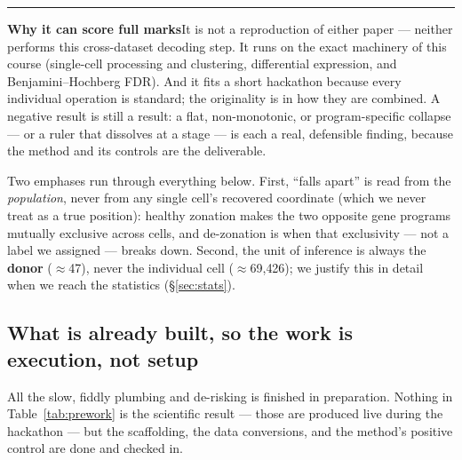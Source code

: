 \documentclass[11pt]{article}
\newcommand{\aside}[2]{\par\medskip\noindent\textcolor{teal0}{\rule{2pt}{\baselineskip}}\quad\textbf{\textcolor{teal0}{#1}}\quad #2\par\medskip}
\begin{document}
\aside{Why it can score full marks}{It is not a reproduction of either paper --- neither performs this
cross-dataset decoding step. It runs on the exact machinery of this course (single-cell processing and
clustering, differential expression, and Benjamini--Hochberg FDR). And it fits a short hackathon
because every individual operation is standard; the originality is in how they are combined. A negative
result is still a result: a flat, non-monotonic, or program-specific collapse --- or a ruler that
dissolves at a stage --- is each a real, defensible finding, because the method and its controls are
the deliverable.}

Two emphases run through everything below. First, ``falls apart'' is read from the \emph{population},
never from any single cell's recovered coordinate (which we never treat as a true position): healthy
zonation makes the two opposite gene programs mutually exclusive across cells, and de-zonation is when
that exclusivity --- not a label we assigned --- breaks down. Second, the unit of inference is always
the \textbf{donor} ($\approx$47), never the individual cell ($\approx$69{,}426); we justify this in
detail when we reach the statistics (\S\ref{sec:stats}).

\subsection{What is already built, so the work is execution, not setup}
\label{sec:prework}

All the slow, fiddly plumbing and de-risking is finished in preparation. Nothing in
Table~\ref{tab:prework} is the scientific result --- those are produced live during the hackathon ---
but the scaffolding, the data conversions, and the method's positive control are done and checked in.
\end{document}
